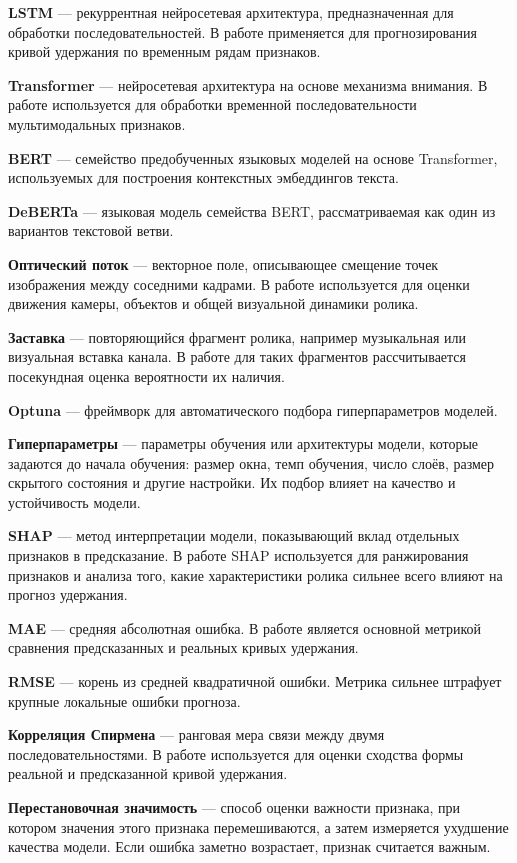 \documentclass[times]{itmo-student-thesis}
\begin{document}
\textbf{LSTM} — рекуррентная нейросетевая архитектура, предназначенная для обработки последовательностей. В работе применяется для прогнозирования кривой удержания по временным рядам признаков.

\textbf{Transformer} — нейросетевая архитектура на основе механизма внимания. В работе используется для обработки временной последовательности мультимодальных признаков.

\textbf{BERT} — семейство предобученных языковых моделей на основе Transformer, используемых для построения контекстных эмбеддингов текста.

\textbf{DeBERTa} — языковая модель семейства BERT, рассматриваемая как один из вариантов текстовой ветви.

\textbf{Оптический поток} — векторное поле, описывающее смещение точек изображения между соседними кадрами. В работе используется для оценки движения камеры, объектов и общей визуальной динамики ролика.

\textbf{Заставка} — повторяющийся фрагмент ролика, например музыкальная или визуальная вставка канала. В работе для таких фрагментов рассчитывается посекундная оценка вероятности их наличия.

\textbf{Optuna} — фреймворк для автоматического подбора гиперпараметров моделей.

\textbf{Гиперпараметры} — параметры обучения или архитектуры модели, которые задаются до начала обучения: размер окна, темп обучения, число слоёв, размер скрытого состояния и другие настройки. Их подбор влияет на качество и устойчивость модели.

\textbf{SHAP} — метод интерпретации модели, показывающий вклад отдельных признаков в предсказание. В работе SHAP используется для ранжирования признаков и анализа того, какие характеристики ролика сильнее всего влияют на прогноз удержания.

\textbf{MAE} — средняя абсолютная ошибка. В работе является основной метрикой сравнения предсказанных и реальных кривых удержания.

\textbf{RMSE} — корень из средней квадратичной ошибки. Метрика сильнее штрафует крупные локальные ошибки прогноза.

\textbf{Корреляция Спирмена} — ранговая мера связи между двумя последовательностями. В работе используется для оценки сходства формы реальной и предсказанной кривой удержания.

\textbf{Перестановочная значимость} — способ оценки важности признака, при котором значения этого признака перемешиваются, а затем измеряется ухудшение качества модели. Если ошибка заметно возрастает, признак считается важным.
\end{document}

